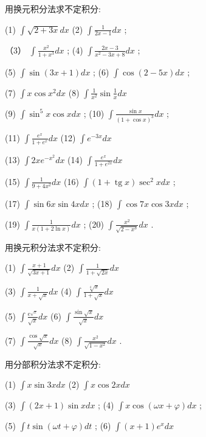 \documentclass[lang=cn,newtx,10pt,scheme=chinese]{elegantbook}
\begin{document}
\begin{problemset}[习 题 十 四]

\item 用换元积分法求不定积分:

(1) \(\int \sqrt{2 + {3x}}{dx}\) (2) \(\int \frac{1}{{2x} - 1}{dx}\) ;

（3） \(\int \frac{{x}^{2}}{1 + {x}^{3}}{dx}\) ; (4) \(\int \frac{{2x} - 3}{{x}^{2} - {3x} + 8}{dx}\) ;

(5) \(\int \sin \left( {{3x} + 1}\right) {dx}\) ; (6) \(\int \cos \left( {2 - {5x}}\right) {dx}\) ;

(7) \(\int x\cos {x}^{2}{dx}\) (8) \(\int \frac{1}{{x}^{2}}\sin \frac{1}{x}{dx}\)

(9) \(\int {\sin }^{5}x\cos {xdx}\) ; (10) \(\int \frac{\sin x}{{\left( 1 + \cos x\right) }^{3}}{dx}\) ;

(11) \(\int \frac{{e}^{x}}{1 + {e}^{x}}{dx}\) (12) \(\int {e}^{-{3x}}{dx}\)

(13) \(\int {2x}{e}^{-{x}^{2}}{dx}\) (14) \(\int \frac{{e}^{x}}{1 + {e}^{2x}}{dx}\)

(15) \(\int \frac{1}{9 + 4{x}^{2}}{dx}\) (16) \(\int \left( {1 + \operatorname{tg}x}\right) {\sec }^{2}{xdx}\) ;

(17) \(\int \sin {6x}\sin {4xdx}\) ; (18) \(\int \cos {7x}\cos {3xdx}\) ;

(19) \(\int \frac{1}{x\left( {1 + 2\ln x}\right) }{dx}\) ; (20) \(\int \frac{{x}^{2}}{\sqrt{2 - {x}^{3}}}{dx}\) .

\item 用换元积分法求不定积分:

(1) \(\int \frac{x + 1}{\sqrt{{3x} + 1}}{dx}\) (2) \(\int \frac{1}{1 + \sqrt{2x}}{dx}\)

(3) \(\int \frac{1}{x + \sqrt{x}}{dx}\) (4) \(\int \frac{\sqrt[4]{x}}{1 + \sqrt{x}}{dx}\)

(5) \(\int \frac{{e}^{\sqrt{x}}}{\sqrt{x}}{dx}\) (6) \(\int \frac{\sin \sqrt{x}}{\sqrt{x}}{dx}\)

(7) \(\int \frac{\cos \sqrt{x}}{\sqrt{x}}{dx}\) (8) \(\int \frac{{x}^{2}}{\sqrt{1 - {x}^{2}}}{dx}\) .

\item 用分部积分法求不定积分:

(1) \(\int x\sin {3xdx}\) (2) \(\int x\cos {2xdx}\)

(3) \(\int \left( {{2x} + 1}\right) \sin {xdx}\) ; (4) \(\int x\cos \left( {{\omega x} + \varphi }\right) {dx}\) ;

(5) \(\int t\sin \left( {{\omega t} + \varphi }\right) {dt}\) ; (6) \(\int \left( {x + 1}\right) {e}^{x}{dx}\)


\end{problemset}
\end{document}
